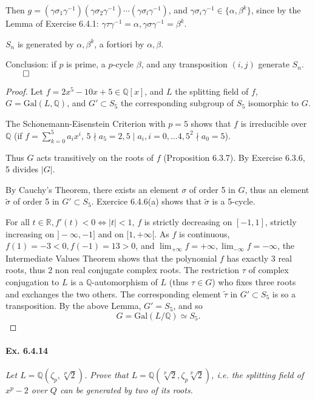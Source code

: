 \documentclass[11pt,a4paper]{article}
\newcommand{\Q}{\mathbb{Q}}
\newcommand{\R}{\mathbb{R}}
\newcommand{\Gal}{\mathrm{Gal}}
\begin{document}
Then $g = (\gamma \sigma_1 \gamma^{-1})(\gamma \sigma_2 \gamma^{-1})\cdots(\gamma \sigma_l \gamma^{-1})$, and $\gamma \sigma_i \gamma^{-1} \in \{ \alpha, \beta^k\}$, since by the Lemma of Exercise 6.4.1: $\gamma \tau \gamma^{-1} = \alpha, \gamma \sigma \gamma^{-1} = \beta^k$.

$S_n$ is generated by $\alpha, \beta^k$, a fortiori by $\alpha, \beta$.

Conclusion: if $p$ is prime, a $p$-cycle $\beta$, and any transposition $(i,j)$ generate $S_n$.
$\qed$

\bigskip 

\begin{proof}
Let $f=2x^5-10x+5 \in \Q[x]$, and $L$ the splitting field of $f$, $G = \Gal(L,\Q)$, and $G' \subset S_5$ the corresponding subgroup of $S_5$ isomorphic to $G$.

The  Sch$\ddot o$nemann-Eisenstein Criterion with $p=5$ shows that $f$ is irreducible over $\Q$ (if  $f= \sum_{k=0}^5 a_i x^i$, $5\nmid a_5=2, 5\mid a_i, i=0,\ldots 4, 5^2\nmid a_0 = 5$).

Thus $G$ acts transitively on the roots of $f$ (Proposition 6.3.7). By Exercise 6.3.6, 5 divides $ \vert G \vert$.

By Cauchy's Theorem, there exists an element $\sigma$ of order 5 in $G$, thus an element  $\tilde{\sigma}$ of order 5 in $G' \subset S_5$. Exercice 6.4.6(a) shows that $\tilde{\sigma}$ is a 5-cycle.

For all $t \in \R, f'(t) <  0 \iff \vert t \vert < 1$, $f$ is strictly decreasing on $[-1,1]$,  strictly increasing on $]-\infty,-1]$ and on $[1,+\infty[$. As $f$ is continuous, $f(1) = -3<0, f(-1) = 13>0$, and $\lim_{+\infty} f= +\infty, \lim_{-\infty} f= -\infty$, the Intermediate Values Theorem shows that the polynomial $f$ has exactly 3 real roots, thus 2 non real conjugate complex roots. The restriction $\tau$ of complex conjugation to $L$ is a $\Q$-automorphism of $L$ (thus $\tau \in G$) who fixes three roots and exchanges the two others. The corresponding element  $\tilde{\tau}$ in $G' \subset S_5$ is so a transposition. By the above Lemma, $G' = S_5$, and so $$G = \Gal(L/\Q) \simeq S_5.$$
\end{proof}

\paragraph{Ex. 6.4.14}

{\it Let $L = \Q(\zeta_p,\sqrt[P]{2})$.  Prove that $L = \Q(\sqrt[p]{2}, \zeta_p \sqrt[p]{2})$, i.e. the splitting field of $x^p-2$ over $Q$ can be generated by two of its roots.
}
\end{document}
